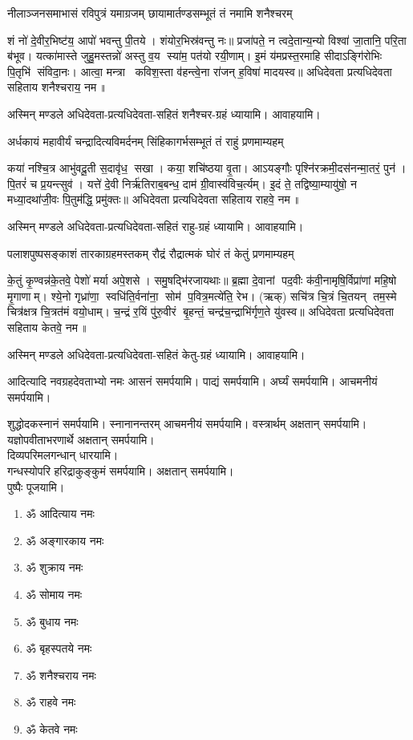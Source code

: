\twolineshloka
{नीलाञ्जनसमाभासं रविपुत्रं यमाग्रजम्}
{छायामार्तण्डसम्भूतं तं नमामि शनैश्चरम्}

शं नो॑ दे॒वीर॒भिष्ट॑य॒ आपो॑ भवन्तु पी॒तये। शंयोर॒भिस्र॑वन्तु नः॥ प्रजा॑पते॒ न त्वदे॒तान्य॒न्यो
विश्वा॑ जा॒तानि॒ परि॒ता ब॑भूव। यत्का॑मास्ते जुहु॒मस्तन्नो॑ अस्तु व॒य स्या॑म॒ पत॑यो रयी॒णाम्। इ॒मं
य॑मप्रस्त॒रमाहि सीदाऽङ्गि॑रोभिः पि॒तृभि॑ संविदा॒नः। आत्वा॒ मन्त्रा कविश॒स्ता व॑हन्त्वे॒ना रा॑जन्
ह॒विषा॑ मादयस्व॥  अधिदेवता प्रत्यधिदेवता सहिताय शनैश्चराय॒ नम॥ 

अस्मिन् मण्डले अधिदेवता-प्रत्यधिदेवता-सहितं शनैश्चर-ग्रहं ध्यायामि। आवाहयामि।

\twolineshloka
{अर्धकायं महावीर्यं चन्द्रादित्यविमर्दनम्}
{सिंहिकागर्भसम्भूतं तं राहुं प्रणमाम्यहम्}

कया॑ नश्चि॒त्र आभु॑वदू॒ती स॒दावृ॑ध॒ सखा। कया॒ शचि॑ष्ठया वृ॒ता। आऽयङ्गौः
पृश्नि॑रक्रमी॒दस॑नन्मा॒तरं॒ पुन॑। पि॒तरं॑ च प्र॒यन्त्सुव॑। यत्ते॑ दे॒वी निर्ऋ॑तिराब॒बन्ध॒ दाम॑
ग्री॒वास्व॑विच॒र्त्यम्। इ॒दं  ते॒ तद्विष्या॒म्यायु॑षो॒ न मध्या॒दथा॑जी॒वः पि॒तुम॑द्धि॒ प्रमु॑क्तः॥ 
अधिदेवता प्रत्यधिदेवता सहिताय राहवे॒ नम॥ 

अस्मिन् मण्डले अधिदेवता-प्रत्यधिदेवता-सहितं राहु-ग्रहं ध्यायामि। आवाहयामि।

\twolineshloka
{पलाशपुष्पसङ्काशं तारकाग्रहमस्तकम्}
{रौद्रं रौद्रात्मकं घोरं तं केतुं प्रणमाम्यहम्}

के॒तुं कृ॒ण्वन्न॑के॒तवे॒ पेशो॑ मर्या अपे॒शसे। समु॒षद्भि॑रजायथाः॥ ब्र॒ह्मा दे॒वानां पद॒वीः
क॑वी॒नामृषि॒र्विप्रा॑णां महि॒षो मृ॒गाणाम्। श्ये॒नो गृध्रा॑णा॒ स्वधि॑ति॒र्वना॑ना॒ सोम॑
प॒वित्र॒मत्ये॑ति॒ रेभ\sn{}। (ऋक्) सचि॑त्र चि॒त्रं चि॒तयन् तम॒स्मे चित्र॑क्षत्र चि॒त्रत॑मं वयो॒धाम्।
च॒न्द्रं र॒यिं पु॑रु॒वीरं बृ॒हन्तं॒ चन्द्र॑च॒न्द्राभि॑र्गृण॒ते यु॑वस्व॥  अधिदेवता प्रत्यधिदेवता
सहिताय केतवे॒ नम॥ 

अस्मिन् मण्डले अधिदेवता-प्रत्यधिदेवता-सहितं केतु-ग्रहं ध्यायामि। आवाहयामि।

आदित्यादि नवग्रहदेवताभ्यो नमः आसनं समर्पयामि।
पाद्यं समर्पयामि। अर्घ्यं समर्पयामि। आचमनीयं समर्पयामि। 

शुद्धोदकस्नानं समर्पयामि। स्नानानन्तरम् आचमनीयं समर्पयामि।
वस्त्रार्थम् अक्षतान् समर्पयामि।\\
यज्ञोपवीताभरणार्थे अक्षतान् समर्पयामि।\\
दिव्यपरिमलगन्धान् धारयामि।\\
गन्धस्योपरि हरिद्राकुङ्कुमं समर्पयामि। अक्षतान् समर्पयामि। \\
पुष्पैः पूजयामि।

\begin{enumerate}%
\item ॐ आदित्याय नमः
\item ॐ अङ्गारकाय नमः
\item ॐ शुक्राय नमः
\item ॐ सोमाय नमः
\item ॐ बुधाय नमः
\item ॐ बृहस्पतये नमः
\item ॐ शनैश्चराय नमः
\item ॐ राहवे नमः
\item ॐ केतवे नमः
\end{enumerate}

